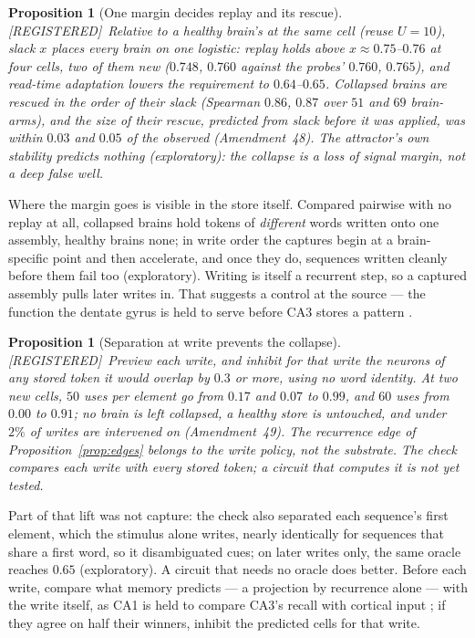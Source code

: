 \documentclass[11pt]{article}
\theoremstyle{definition}
\theoremstyle{plain}
\newtheorem{proposition}[lemma]{Proposition}
\newcommand{\REG}{\textnormal{\footnotesize\textsf{[REGISTERED]}}}
\begin{document}
\begin{proposition}[One margin decides replay and its rescue]\label{prop:margin} \REG\
Relative to a healthy brain's at the same cell (reuse $U = 10$), slack $x$ places
every brain on one logistic: replay holds above $x \approx 0.75$--$0.76$ at four
cells, two of them new ($0.748$, $0.760$ against the probes' $0.760$,
$0.765$), and read-time adaptation lowers the requirement to $0.64$--$0.65$.
Collapsed brains are rescued in the order of their slack (Spearman $0.86$,
$0.87$ over $51$ and $69$ brain-arms), and the size of their rescue, predicted
from slack before it was applied, was within $0.03$ and $0.05$ of the observed
(Amendment~48). The attractor's own stability predicts nothing (exploratory):
the collapse is a loss of signal margin, not a deep false well.
\end{proposition}

Where the margin goes is visible in the store itself. Compared pairwise with no
replay at all, collapsed brains hold tokens of \emph{different} words written
onto one assembly, healthy brains none; in write order the captures begin at a
brain-specific point and then accelerate, and once they do, sequences written
cleanly before them fail too (exploratory). Writing is itself a recurrent step,
so a captured assembly pulls later writes in. That suggests a control at the
source --- the function the dentate gyrus is held to serve before CA3 stores a
pattern \citep{mcclelland1995why}.

\begin{proposition}[Separation at write prevents the collapse]\label{prop:separation} \REG\
Preview each write, and inhibit for that write the neurons of any stored token
it would overlap by $0.3$ or more, using no word identity. At two new cells,
$50$ uses per element go from $0.17$ and $0.07$ to $0.99$, and $60$ uses from
$0.00$ to $0.91$; no brain is left collapsed, a healthy store is untouched, and
under $2\%$ of writes are intervened on (Amendment~49). The recurrence edge of
Proposition~\ref{prop:edges} belongs to the write policy, not the substrate.
The check compares each write with every stored token; a circuit that
computes it is not yet tested.
\end{proposition}

Part of that lift was not capture: the check also separated each sequence's
first element, which the stimulus alone writes, nearly identically for
sequences that share a first word, so it disambiguated cues; on later writes
only, the same oracle reaches $0.65$ (exploratory). A circuit that needs no
oracle does better. Before each write, compare what memory predicts --- a
projection by recurrence alone --- with the write itself, as CA1 is held to
compare CA3's recall with cortical input \citep{vinogradova2001hippocampus,lisman2005hippocampal};
if they agree on half their winners, inhibit the predicted cells for that write.
\end{document}
